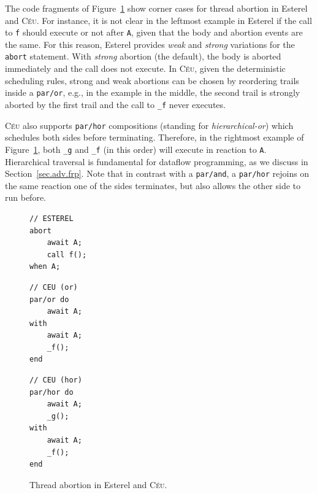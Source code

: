\documentclass{acm_proc_article-sp}
\newcommand{\CEU}{\textsc{C\'{e}u}\xspace}
\newcommand{\code}[1] {{\small{\texttt{#1}}}}
\newcommand{\1}{\;}
\newcommand{\2}{\;\;}
\newcommand{\3}{\;\;\;}
\newcommand{\5}{\;\;\;\;\;}
\begin{document}
The code fragments of Figure~\ref{lst.abortion} show corner cases for thread 
abortion in Esterel and \CEU.
%
For instance, it is not clear in the leftmost example in Esterel if the call to 
\code{f} should execute or not after \code{A}, given that the body and abortion 
events are the same.
%
For this reason, Esterel provides \emph{weak} and \emph{strong} variations for 
the \code{abort} statement.
With \emph{strong} abortion (the default), the body is aborted immediately and 
the call does not execute.
%
In \CEU, given the deterministic scheduling rules, strong and weak abortions 
can be chosen by reordering trails inside a \code{par/or}, e.g., in the example 
in the middle, the second trail is strongly aborted by the first trail and the 
call to \code{\_f} never executes.

\CEU also supports \code{par/hor} compositions (standing for 
\emph{hierarchical-or}) which schedules both sides before terminating.
Therefore, in the rightmost example of Figure~\ref{lst.abortion}, both 
\code{\_g} and \code{\_f} (in this order) will execute in reaction to \code{A}.
Hierarchical traversal is fundamental for dataflow programming, as we discuss 
in Section~\ref{sec.adv.frp}.
Note that in contrast with a \code{par/and}, a \code{par/hor} rejoins on the 
same reaction one of the sides terminates, but also allows the other side to 
run before.

\begin{figure}[h]
\begin{minipage}[t]{0.32\linewidth}
\begin{lstlisting}
// ESTEREL
abort
    await A;
    call f();
when A;
\end{lstlisting}
\end{minipage}
%
\begin{minipage}[t]{0.32\linewidth}
\begin{lstlisting}
// CEU (or)
par/or do
    await A;
with
    await A;
    _f();
end
\end{lstlisting}
\end{minipage}
%
\begin{minipage}[t]{0.32\linewidth}
\begin{lstlisting}
// CEU (hor)
par/hor do
    await A;
    _g();
with
    await A;
    _f();
end
\end{lstlisting}
\end{minipage}
\caption{ Thread abortion in Esterel and \CEU. %
\label{lst.abortion}
}
\end{figure}
\end{document}
